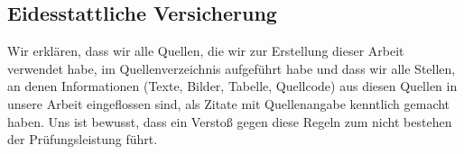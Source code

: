 \subsection*{Eidesstattliche Versicherung}\label{subsec:eidesstaatliche-versicherung}
Wir erklären, dass wir alle Quellen, die wir zur Erstellung dieser Arbeit verwendet habe, im Quellenverzeichnis aufgeführt habe und dass wir alle Stellen, an denen Informationen (Texte, Bilder, Tabelle, Quellcode) aus diesen Quellen in unsere Arbeit eingeflossen sind, als Zitate mit Quellenangabe kenntlich gemacht haben.
Uns ist bewusst, dass ein Verstoß gegen diese Regeln zum nicht bestehen der Prüfungsleistung führt.
